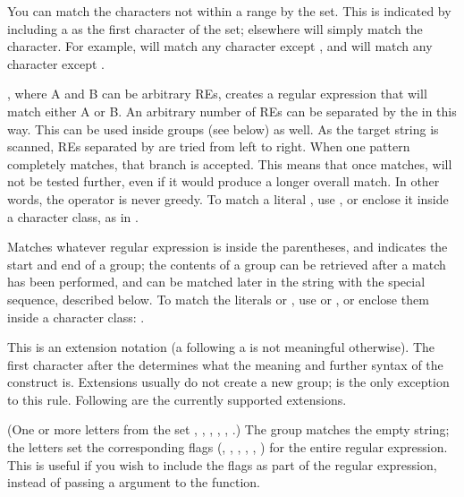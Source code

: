 \begin{description}
You can match the characters not within a range by 
the set.  This is indicated by including a
\character{\textasciicircum} as the first character of the set;
\character{\textasciicircum} elsewhere will simply match the
\character{\textasciicircum} character.  For example,
\regexp{[{\textasciicircum}5]} will match
any character except , and
\regexp{[\textasciicircum\code{\textasciicircum}]} will match any character
except \character{\textasciicircum}.

\item[\character{|}], where A and B can be arbitrary REs,
creates a regular expression that will match either A or B.  An
arbitrary number of REs can be separated by the \character{|} in this
way.  This can be used inside groups (see below) as well.  As the target
string is scanned, REs separated by \character{|} are tried from left to
right. When one pattern completely matches, that branch is accepted.
This means that once  matches,  will not be tested further,
even if it would produce a longer overall match.  In other words, the
\character{|} operator is never greedy.  To match a literal \character{|},
use \regexp{\e|}, or enclose it inside a character class, as in \regexp{[|]}.

\item[\code{(...)}] Matches whatever regular expression is inside the
parentheses, and indicates the start and end of a group; the contents
of a group can be retrieved after a match has been performed, and can
be matched later in the string with the  special
sequence, described below.  To match the literals \character{(} or
\character{)}, use \regexp{\e(} or \regexp{\e)}, or enclose them
inside a character class: \regexp{[(] [)]}.

\item[\code{(?...)}] This is an extension notation (a 
following a \character{(} is not meaningful otherwise).  The first
character after the 
determines what the meaning and further syntax of the construct is.
Extensions usually do not create a new group;
 is the only exception to this rule.
Following are the currently supported extensions.

\item[\code{(?iLmsux)}] (One or more letters from the set ,
, , , ,
.)  The group matches the empty string; the letters set
the corresponding flags (, ,
, , , )
for the entire regular expression.  This is useful if you wish to
include the flags as part of the regular expression, instead of
passing a  argument to the  function.


\end{description}
